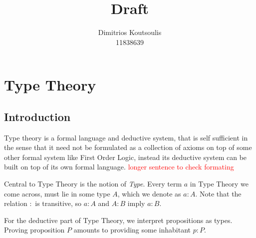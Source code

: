 \documentclass[12pt]{article}
\newcommand\todo[1]{\textcolor{red}{#1}}
\begin{document}
 
\title{Draft}%
\author{Dimitrios Koutsoulis\\ %
11838639} %
 
\maketitle
\section{Type Theory}
\subsection{Introduction}
Type theory is a formal language and deductive system, that is self sufficient in the sense that it need not be formulated as a collection of axioms on top of some other formal system like First Order Logic, instead its deductive system can be built on top of its own formal language. 
\todo{longer sentence to check formating }

Central to Type Theory is the notion of \textit{Type}. Every term $a$ in Type Theory we come across, must lie in some type $A$, which we denote as $a : A$. Note that the relation $:$ is transitive, so $a : A$ and $A : B$ imply $a : B$. 

For the deductive part of Type Theory, we interpret propositions as types. Proving proposition $P$ amounts to providing some inhabitant $p : P$. 
\end{document}
